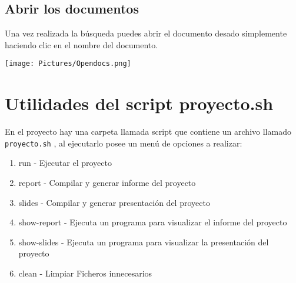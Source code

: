 \documentclass[a4paper,12pt]{article}
\begin{document}
\subsection{Abrir los documentos}\label{sub:OpenDocs}
Una vez realizada la búsqueda puedes abrir el documento desado simplemente haciendo clic en el nombre del documento.


\begin{center}
    \texttt{[image: Pictures/Opendocs.png]}
\end{center}

\section{Utilidades del script proyecto.sh}

En el proyecto hay una carpeta llamada script que contiene un archivo llamado \texttt{proyecto.sh} , al ejecutarlo
posee un menú de opciones a realizar:

\begin{enumerate}
    \item run - Ejecutar el proyecto
    \item report - Compilar y generar informe del proyecto
    \item slides - Compilar y generar presentación del proyecto
    \item show-report - Ejecuta un programa para visualizar el informe del proyecto
    \item show-slides - Ejecuta un programa para visualizar la presentación del proyecto
    \item clean - Limpiar Ficheros innecesarios
\end{enumerate}
\end{document}
